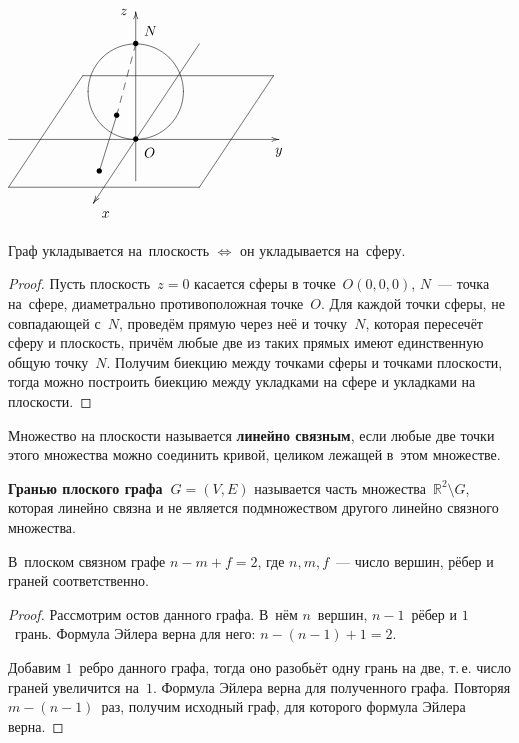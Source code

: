 \begin{floatingfigure}[r]{71mm}
\noindent
$\begin{xy} /r8mm/:
(-4, 0); (4.5, 0) **@{-} *@{>} *++!U{y}; %
(0, -1.3); (0, 4) **@{-} *@{>} *++!R{z}; %
(2, 3); (-1.3333, -2) **@{-} *@{>} *++!LU{x}; %
(-4, -1.5) = "1"; (2, -1.5) = "2" **@{-};
(2.3333, 3.5) = "off";
"1"; "1"+"off" = "3" **@{-};
"2"; "2"+"off" = "4" **@{-};
"3"; "4" **@{-};
(0, 1.5) *\cir<12mm>{};
(0, 0) *{\bullet} *++!LU{O};
(0, 3) *{\bullet} *++!DL{N};
(-0.6, 0.75) = "sph" **@{--} *{\bullet};
"sph"; (-1.1467, -1) **@{-} *{\bullet};
\end{xy}$
\end{floatingfigure}
\begin{theorem}
Граф укладывается на~плоскость $\Leftrightarrow$ он укладывается на~сферу.
\end{theorem}
\begin{proof}
Пусть плоскость~$z = 0$ касается сферы в точке~$O(0, 0, 0)$, $N$~--- точка на~сфере, диаметрально противоположная точке~$O$.
Для каждой точки сферы, не совпадающей с~$N$, проведём прямую через неё и точку~$N$, которая пересечёт сферу и плоскость, причём любые две из таких прямых имеют единственную общую точку~$N$.
Получим биекцию между точками сферы и точками плоскости, тогда можно построить биекцию между укладками на сфере и укладками на плоскости.
\end{proof}

Множество на плоскости называется \textbf{линейно связным}, если любые две точки этого множества можно соединить кривой, целиком лежащей в~этом множестве.

 \textbf{Гранью плоского графа~$G = (V, E)$} называется часть множества~$\mathbb R^2 \setminus G$, которая линейно связна и не является подмножеством другого линейно связного множества.

\begin{theorem}
В~плоском связном графе $n - m + f = 2$, где $n, m, f$~--- число вершин, рёбер и граней соответственно.
\end{theorem}
\begin{proof}
Рассмотрим остов данного графа.
В~нём $n$~вершин, $n - 1$~рёбер и $1$~грань.
Формула Эйлера верна для него: $n - (n - 1) + 1 = 2$.

Добавим $1$~ребро данного графа, тогда оно разобьёт одну грань на две, т.\,е. число граней увеличится на~$1$.
Формула Эйлера верна для полученного графа.
Повторяя $m - (n - 1)$~раз, получим исходный граф, для которого формула Эйлера верна.
\end{proof}

